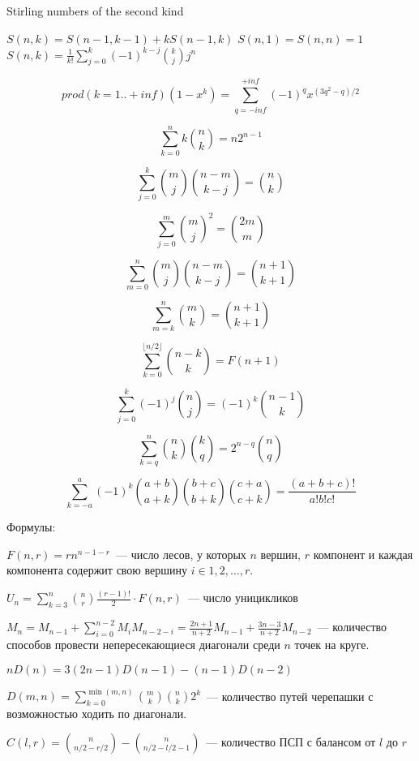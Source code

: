 Stirling numbers of the second kind

$S(n, k) = S(n - 1, k - 1) + kS(n - 1, k)$
$S(n, 1) = S(n, n) = 1$
$S(n, k) = \frac{1}{k!} \sum_{j=0}^{k}{(-1)^{k - j}\binom{k}{j}j^n}$

$$prod (k=1..+inf) (1-x^k) = \sum_{q=-inf}^{+inf} {(-1)^q x^{(3q^2-q)/2}}$$

$$\sum_{k = 0}^{n}{k \binom{n}{k}} = n 2^{n - 1}$$

$$\sum_{j = 0}^{k}{\binom{m}{j} \binom{n - m}{k - j}} = \binom{n}{k}$$

$$\sum_{j = 0}^{m}{\binom{m}{j}^2} = \binom{2m}{m}$$

$$\sum_{m = 0}^{n}{\binom{m}{j}\binom{n - m}{k - j}} = \binom{n + 1}{k + 1}$$

$$\sum_{m = k}^{n}{\binom{m}{k}} = \binom{n + 1}{k + 1}$$

$$\sum_{k = 0}^{\lfloor n / 2 \rfloor}{\binom{n - k}{k}} = F(n + 1)$$

$$\sum_{j = 0}^{k}{(-1)^{j} \binom{n}{j}} = (-1)^k \binom{n - 1}{k}$$

$$\sum_{k = q}^{n}{\binom{n}{k} \binom{k}{q}} = 2^{n - q}\binom{n}{q}$$

$$\sum_{k =-a}^{a}{(-1)^k \binom{a + b}{a + k} \binom{b + c}{b + k} \binom{c + a}{c + k} } = \frac{(a + b + c)!}{a! b! c!}$$

Формулы:

$F(n, r) = rn^{n - 1 - r}$~--- число лесов, у которых $n$ вершин, $r$ компонент и каждая компонента
содержит свою вершину $i \in 1, 2, \dots , r$. 

$U_n = \sum_{k=3}^{n}{\binom{n}{r} \frac{(r - 1)!}{2} \cdot F(n, r)}$~--- число уницикликов

$M_n = M_{n - 1} + \sum_{i=0}^{n-2}{M_i M_{n - 2 - i}} = \frac{2n + 1}{n + 2}M_{n - 1} + \frac{3n - 3}{n + 2}M_{n - 2}$~--- 
количество способов провести непересекающиеся диагонали среди $n$ точек на круге.

$nD(n) = 3(2n - 1)D(n - 1) - (n - 1)D(n - 2)$

$D(m, n) = \sum_{k=0}^{\min(m, n)}{\binom{m}{k} \binom{n}{k} 2^k}$~--- количество путей черепашки с возможностью ходить по диагонали.

$C(l, r) = \binom{n}{n / 2 - r / 2} - \binom{n}{n / 2 - l / 2 - 1}$~--- количество ПСП с балансом от $l$ до $r$